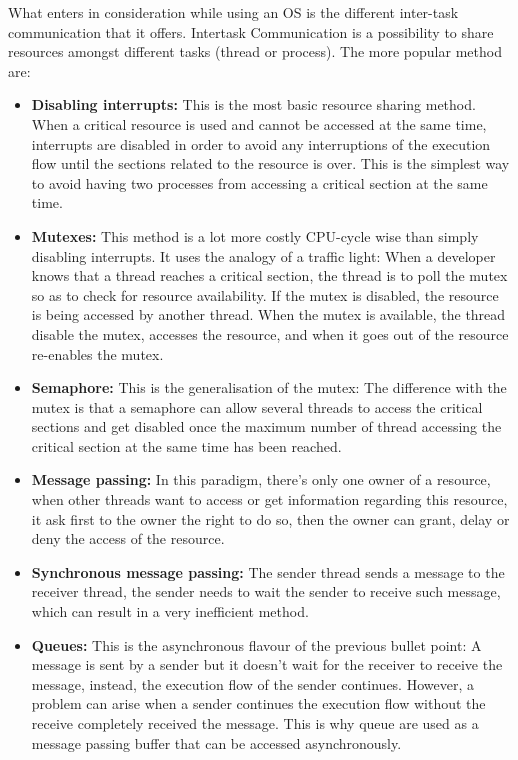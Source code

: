 What enters in consideration while using an OS is the different inter-task communication that it offers. Intertask Communication is a possibility to share resources amongst different tasks (thread or process). The more popular method are:
\begin{itemize}
\item\textbf{Disabling interrupts:} This is the most basic resource sharing method. When a critical resource is used and cannot be accessed at the same time, interrupts are disabled in order to avoid any interruptions of the execution flow until the sections related to the resource is over. This is the simplest way to avoid having two processes from accessing a critical section at the same time.
\item\textbf{Mutexes:} This method is a lot more costly CPU-cycle wise than simply disabling interrupts. It uses the analogy of a traffic light: When a developer knows that a thread reaches a critical section, the thread is to poll the mutex so as to check for resource availability. If the mutex is disabled, the resource is being accessed by another thread. When the mutex is available, the thread disable the mutex, accesses the resource, and when it goes out of the resource re-enables the mutex.
\item\textbf{Semaphore:} This is the generalisation of the mutex: The difference with the mutex is that a semaphore can allow several threads to access the critical sections and get disabled once the maximum number of thread accessing the critical section at the same time has been reached.
\item\textbf{Message passing:} In this paradigm, there's only one owner of a resource, when other threads want to access or get information regarding this resource, it ask first to the owner the right to do so, then the owner can grant, delay or deny the access of the resource.
\item\textbf{Synchronous message passing:} The sender thread sends a message to the receiver thread, the sender needs to wait the sender to receive such message, which can result in a very inefficient method.
\item\textbf{Queues:} This is the asynchronous flavour of the previous bullet point: A message is sent by a sender but it doesn't wait for the receiver to receive the message, instead, the execution flow of the sender continues. However, a problem can arise when a sender continues the execution flow without the receive completely received the message. This is why queue are used as a message passing buffer that can be accessed asynchronously.
\end{itemize}


